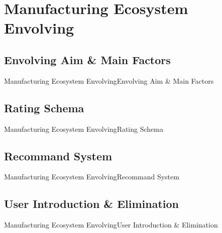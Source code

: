 \section{Manufacturing Ecosystem Envolving}
\subsection{Envolving Aim \& Main Factors}
\begin{frame}{Manufacturing Ecosystem Envolving}{Envolving Aim \& Main Factors}

\end{frame}

\subsection{Rating Schema}
\begin{frame}{Manufacturing Ecosystem Envolving}{Rating Schema}

\end{frame}

\subsection{Recommand System}
\begin{frame}{Manufacturing Ecosystem Envolving}{Recommand System}

\end{frame}

\subsection{User Introduction \& Elimination}
\begin{frame}{Manufacturing Ecosystem Envolving}{User Introduction \& Elimination}

\end{frame}